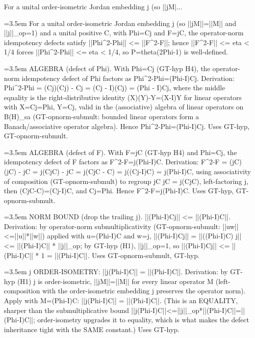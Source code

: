 \documentclass{article}
\newcommand{\step}[1]{\par\noindent\hangindent=3.5em\hangafter=1%
  \makebox[3.5em][l]{\textbf{#1.}}}
\begin{document}
\begin{proofbox}{For a unital order-isometric Jordan embedding j (so ||jM|...}
\step{1} For a unital order-isometric Jordan embedding j (so ||jM||=||M|| and ||j||\_op=1) and a unital positive C, with Phi=Cj and F=jC, the operator-norm idempotency defects satisfy ||Phi\textasciicircum{}2-Phi|| <= ||F\textasciicircum{}2-F||; hence ||F\textasciicircum{}2-F|| <= eta < 1/4 forces ||Phi\textasciicircum{}2-Phi|| <= eta < 1/4, so P=theta(2Phi-1) is well-defined. \\[6pt]
\step{1.1} ALGEBRA (defect of Phi). With Phi=Cj (GT-hyp H4), the operator-norm idempotency defect of Phi factors as Phi\textasciicircum{}2-Phi=(Phi-I)Cj. Derivation: Phi\textasciicircum{}2-Phi = (Cj)(Cj) - Cj = (Cj - I)(Cj) = (Phi - I)Cj, where the middle equality is the right-distributive identity (X)(Y)-Y=(X-I)Y for linear operators with X=Cj=Phi, Y=Cj, valid in the (associative) algebra of linear operators on B(H)\_sa (GT-opnorm-submult: bounded linear operators form a Banach/associative operator algebra). Hence Phi\textasciicircum{}2-Phi=(Phi-I)Cj. Uses GT-hyp, GT-opnorm-submult. \\[4pt]
\step{1.2} ALGEBRA (defect of F). With F=jC (GT-hyp H4) and Phi=Cj, the idempotency defect of F factors as F\textasciicircum{}2-F=j(Phi-I)C. Derivation: F\textasciicircum{}2-F = (jC)(jC) - jC = j(CjC) - jC = j(CjC - C) = j((Cj-I)C) = j(Phi-I)C, using associativity of composition (GT-opnorm-submult) to regroup jC jC = j(CjC), left-factoring j, then (CjC-C)=(Cj-I)C, and Cj=Phi. Hence F\textasciicircum{}2-F=j(Phi-I)C. Uses GT-hyp, GT-opnorm-submult. \\[4pt]
\step{1.3} NORM BOUND (drop the trailing j). ||(Phi-I)Cj|| <= ||(Phi-I)C||. Derivation: by operator-norm submultiplicativity (GT-opnorm-submult: ||uw||<=||u||*||w||) applied with u=(Phi-I)C and w=j, ||(Phi-I)Cj|| = ||((Phi-I)C) j|| <= ||(Phi-I)C|| * ||j||\_op; by GT-hyp (H1), ||j||\_op=1, so ||(Phi-I)Cj|| <= ||(Phi-I)C|| * 1 = ||(Phi-I)C||. Uses GT-opnorm-submult, GT-hyp. \\[6pt]
\step{1.3.1} j ORDER-ISOMETRY: ||j(Phi-I)C|| = ||(Phi-I)C||. Derivation: by GT-hyp (H1) j is order-isometric, ||jM||=||M|| for every linear operator M (left-composition with the order-isometric embedding j preserves the operator norm). Apply with M=(Phi-I)C: ||j(Phi-I)C|| = ||(Phi-I)C||. (This is an EQUALITY, sharper than the submultiplicative bound ||j(Phi-I)C||<=||j||\_op*||(Phi-I)C||=||(Phi-I)C||; order-isometry upgrades it to equality, which is what makes the defect inheritance tight with the SAME constant.) Uses GT-hyp. \\[4pt]

\end{proofbox}
\end{document}
